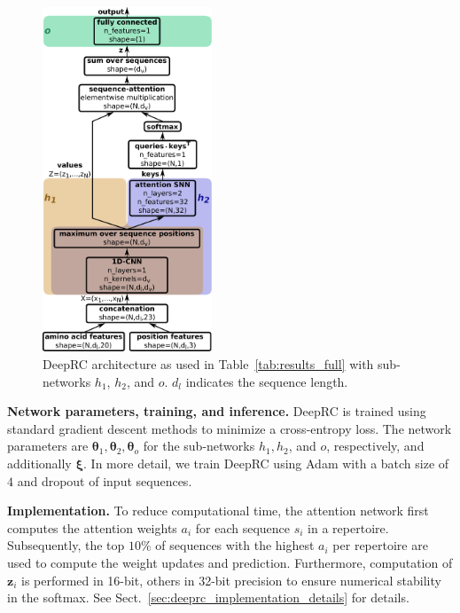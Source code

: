 \documentclass[oneside]{book}
\newcommand\Bz{\bm{z}}
\newcommand\Bxi{\bm{\xi}}
\begin{document}
\begin{figure}
%
  \begin{center}
    \includegraphics[width=0.45\textwidth]{figures/architecture_paper_v7.pdf}
  \end{center}
  \caption[]{DeepRC architecture as used in Table~\ref{tab:results_full} with sub-networks $h_1$, $h_2$, and $o$. $d_l$ indicates the sequence length.
   \label{fig:deeprc_architecture}}
\end{figure}



\textbf{Network parameters, training, and inference.}
DeepRC is trained using standard gradient descent methods 
to minimize a cross-entropy loss. 
The network parameters are $\bm \theta_1, \bm \theta_2, \bm \theta_o$ for the 
sub-networks $h_1, h_2$, and $o$, respectively, 
and additionally $\Bxi$. In more detail, we train DeepRC using 
Adam \citep{kingma2014adam} with a
batch size of $4$ and dropout of input sequences.
%

%

%


%
%

\textbf{Implementation.}
%
To reduce computational time,
the attention network first computes the attention weights $a_i$ for each sequence $s_i$ in a repertoire.
Subsequently, the top $10\%$ of sequences 
with the highest $a_i$ per repertoire 
are used to compute the weight updates and prediction.
Furthermore, computation of $\Bz_i$ is performed in 16-bit,
others in 32-bit precision to ensure numerical stability in the softmax. See Sect.~\ref{sec:deeprc_implementation_details} for details.
\end{document}
